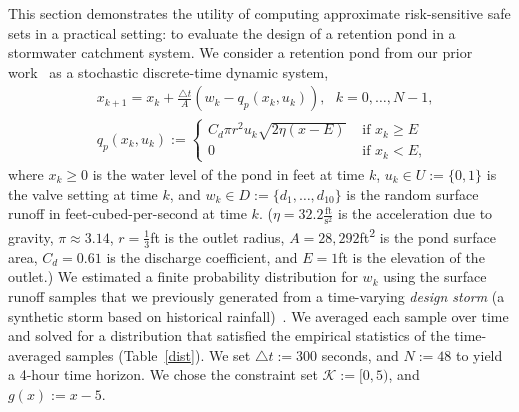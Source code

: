 \documentclass[letterpaper, 10 pt, conference]{ieeeconf}  %
\begin{document}
This section demonstrates the utility of computing approximate risk-sensitive safe sets in a practical setting:
to evaluate the design of a retention pond in a stormwater catchment system. We consider a retention pond from our prior work~\cite{sustech} as a stochastic discrete-time dynamic system,
\begin{equation}\begin{aligned}
& x_{k+1} = x_k + \frac{\triangle t}{A} (w_k - q_p(x_k, u_k)), \text{ }k = 0, \dots, N-1, \\
& q_p(x_k,u_k) := \begin{cases} C_d \pi r^2 u_k \sqrt{ 2\eta(x-E) } & \text{ if } x_k \geq E \\
						0 & \text{ if } x_k < E, \end{cases}
\end{aligned}\label{watersys}\end{equation}
where $x_k \geq 0$ is the water level of the pond in feet at time $k$, $u_k \in U := \{0, 1\}$ is the valve setting at time $k$,
and $w_k \in D := \{d_1, \dots, d_{10}\}$ is the random surface runoff in feet-cubed-per-second at time $k$. ($\eta = 32.2\frac{\text{ft}}{\text{s}^2}$ is the acceleration due to gravity, $\pi \approx 3.14$, $r = \frac{1}{3}$ft is the outlet radius, $A = 28,292$ft\textsuperscript{2} is the pond surface area, $C_d = 0.61$ is the discharge coefficient,
and $E = 1$ft is the elevation of the outlet.)
We estimated a finite probability distribution for $w_k$ using the surface runoff samples that we previously generated from a time-varying \textit{design storm}
(a synthetic storm based on historical rainfall)~\cite{sustech}. 
We averaged each sample over time and solved for a distribution that satisfied the empirical statistics of the time-averaged samples (Table~\ref{dist}). 
We set $\triangle t := 300$ seconds, and $N := 48$ to yield a 4-hour time horizon.
We chose the constraint set $\mathcal{K} := [0, 5)$, and $g(x) := x - 5$.
%
\end{document}
